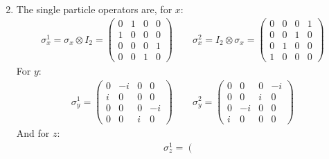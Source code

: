 \documentclass[12pt,a4]{article}
\begin{document}
\begin{enumerate}
\begin{enumerate}
\begin{align*}
        \end{align*}
  \end{enumerate}
  \item
    The single particle operators are, for $x$:
    \begin{align*}
      \sigma_{x}^{1} = \sigma_x \otimes I_2 =
                       \left(\begin{matrix}
                        0 &  1 & 0 &  0\\
                        1 &  0 & 0 &  0\\
                        0 &  0 & 0 &  1\\
                        0 &  0 & 1 &  0
                      \end{matrix} \right)
                      \qquad
      \sigma_{x}^{2} = I_2 \otimes \sigma_x = 
                      \left(\begin{matrix}
                        0 &  0 & 0 &  1\\
                        0 &  0 & 1 &  0\\
                        0 &  1 & 0 &  0\\
                        1 &  0 & 0 &  0
                      \end{matrix} \right)
    \end{align*}
    For $y$:
    \begin{align*}
      \sigma_{y}^{1} = 
                       \left(\begin{matrix}
                        0 & -i & 0 &  0\\
                        i &  0 & 0 &  0\\
                        0 &  0 & 0 & -i\\
                        0 &  0 & i &  0
                      \end{matrix} \right)
                      \qquad
      \sigma_{y}^{2} =  
                      \left(\begin{matrix}
                        0 &  0 & 0 & -i\\
                        0 &  0 & i &  0\\
                        0 & -i & 0 &  0\\
                        i &  0 & 0 &  0
                      \end{matrix} \right)
    \end{align*}
    And for $z$:
    \begin{align*}
      \sigma_{z}^{1} =                       
                       \left(\begin{matrix}

\end{matrix}
\end{align*}
\end{enumerate}
\end{document}
